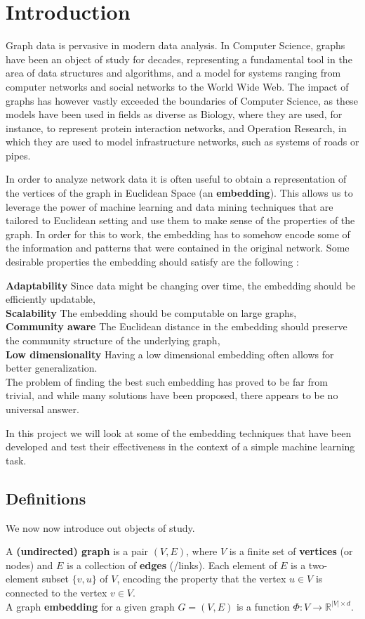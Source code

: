 \section{Introduction}
Graph data is pervasive in modern data analysis. In Computer Science, graphs have been an object of study for decades, representing a fundamental tool in the area of data structures and algorithms, and a model for systems ranging from computer networks and social networks to the World Wide Web. The impact of graphs has however vastly exceeded the boundaries of Computer Science, as these models have been used in fields as diverse as Biology, where they are used, for instance, to represent protein interaction networks, and Operation Research, in which they are used to model infrastructure networks, such as systems of roads or pipes.

In order to analyze network data it is often useful to obtain a representation of the vertices of the graph in Euclidean Space (an \textbf{embedding}). This allows us to leverage the power of machine learning and data mining techniques that are tailored to Euclidean setting and use them to make sense of the properties of the graph. In order for this to work, the embedding has to somehow encode some of the information and patterns that were contained in the original network. Some desirable properties the embedding should satisfy are the following \cite{chen2018tutorial}:

\textbf{Adaptability} Since data might be changing over time, the embedding should be efficiently updatable,\\
\textbf{Scalability} The embedding should be computable on large graphs,\\
\textbf{Community aware} The Euclidean distance in the embedding should preserve the community structure of the underlying graph,\\
\textbf{Low dimensionality} Having a low dimensional embedding often allows for better generalization.\\


The problem of finding the best such embedding has proved to be far from trivial, and while many solutions have been proposed, there appears to be no universal answer.

In this project we will look at some of the embedding techniques that have been developed and test their effectiveness in the context of a simple machine learning task.


\subsection*{Definitions}
We now now introduce out objects of study.

A \textbf{(undirected) graph} is a pair $(V,E)$, where $V$ is a finite set of \textbf{vertices} (or nodes) and $E$ is a collection of \textbf{edges} (/links). Each element of $E$ is a two-element subset $\{v,u\}$ of $V$, encoding the property that the vertex $u \in V$ is connected to the vertex $v \in V$.\\

A graph \textbf{embedding} for a given graph $G = (V,E)$ is a function $\Phi:V \to \mathbb{R}^{|V| \times d}$.

